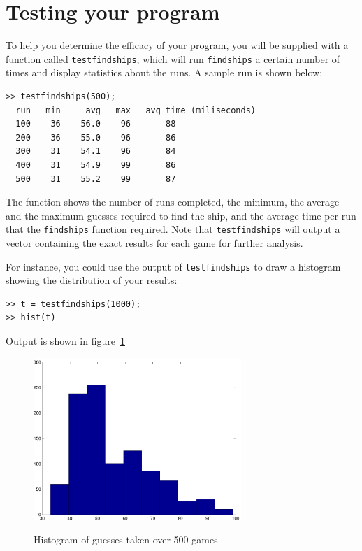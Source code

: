 \documentclass[a4paper, 12pt]{article}
\begin{document}
\section{Testing your program}
To help you determine the efficacy of your program, you will be
supplied with a function called \verb|testfindships|, which will run
\verb|findships| a certain number of times and display statistics
about the runs.  A sample run is shown below:

\begin{verbatim}
>> testfindships(500);
  run   min     avg   max   avg time (miliseconds)
  100    36    56.0    96       88
  200    36    55.0    96       86
  300    31    54.1    96       84
  400    31    54.9    99       86
  500    31    55.2    99       87
\end{verbatim}

The function shows the number of runs completed, the minimum, the
average and the maximum guesses required to find the ship, and the
average time per run that the \verb|findships| function required.
Note that \verb|testfindships| will output a vector containing the
exact results for each game for further analysis.

For instance, you could use the output of \verb|testfindships| to draw
a histogram showing the distribution of your results:

\begin{verbatim}
>> t = testfindships(1000);
>> hist(t)
\end{verbatim}
Output is shown in figure~\ref{fig:histogram}

\begin{figure}[htbp]
  \centering
  \includegraphics[width=0.7\textwidth]{battlehist}\\
  \caption{Histogram of guesses taken over 500 games}
  \label{fig:histogram}
\end{figure}
\end{document}
